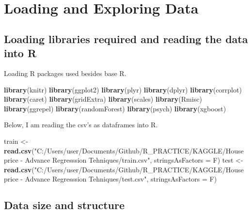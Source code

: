 \documentclass[]{article}
\newenvironment{Shaded}{\begin{snugshade}}{\end{snugshade}}
\newcommand{\KeywordTok}[1]{\textcolor[rgb]{0.13,0.29,0.53}{\textbf{#1}}}
\newcommand{\DataTypeTok}[1]{\textcolor[rgb]{0.13,0.29,0.53}{#1}}
\newcommand{\StringTok}[1]{\textcolor[rgb]{0.31,0.60,0.02}{#1}}
\newcommand{\NormalTok}[1]{#1}
\begin{document}
\section{Loading and Exploring Data}\label{loading-and-exploring-data}

\subsection{Loading libraries required and reading the data into
R}\label{loading-libraries-required-and-reading-the-data-into-r}

Loading R packages used besides base R.

\begin{Shaded}
\begin{Highlighting}[]
\KeywordTok{library}\NormalTok{(knitr)}
\KeywordTok{library}\NormalTok{(ggplot2)}
\KeywordTok{library}\NormalTok{(plyr)}
\KeywordTok{library}\NormalTok{(dplyr)}
\KeywordTok{library}\NormalTok{(corrplot)}
\KeywordTok{library}\NormalTok{(caret)}
\KeywordTok{library}\NormalTok{(gridExtra)}
\KeywordTok{library}\NormalTok{(scales)}
\KeywordTok{library}\NormalTok{(Rmisc)}
\KeywordTok{library}\NormalTok{(ggrepel)}
\KeywordTok{library}\NormalTok{(randomForest)}
\KeywordTok{library}\NormalTok{(psych)}
\KeywordTok{library}\NormalTok{(xgboost)}
\end{Highlighting}
\end{Shaded}

Below, I am reading the csv's as dataframes into R.

\begin{Shaded}
\begin{Highlighting}[]
\NormalTok{train <-}\StringTok{ }\KeywordTok{read.csv}\NormalTok{(}\StringTok{"C:/Users/user/Documents/Github/R_PRACTICE/KAGGLE/House price - Advance Regresssion Tehniques/train.csv"}\NormalTok{, }\DataTypeTok{stringsAsFactors =}\NormalTok{ F)}
\NormalTok{test <-}\StringTok{ }\KeywordTok{read.csv}\NormalTok{(}\StringTok{"C:/Users/user/Documents/Github/R_PRACTICE/KAGGLE/House price - Advance Regresssion Tehniques/test.csv"}\NormalTok{, }\DataTypeTok{stringsAsFactors =}\NormalTok{ F)}
\end{Highlighting}
\end{Shaded}

\subsection{Data size and structure}\label{data-size-and-structure}
\end{document}
